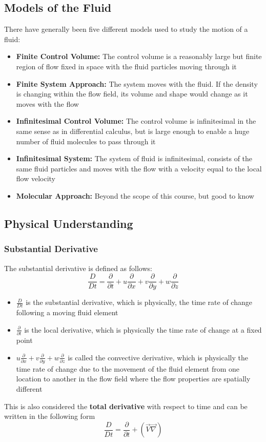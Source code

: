\documentclass[11pt]{article}
\begin{document}
\subsection{Models of the Fluid}
There have generally been five different models used to study the motion of a fluid:
\begin{itemize}
\item \textbf{Finite Control Volume:} The control volume is a reasonably large but finite region of flow fixed in space with the fluid particles moving through it
\item \textbf{Finite System Approach:} The system moves with the fluid. If the density is changing within the flow field, its volume and shape would change as it moves with the flow
\item \textbf{Infinitesimal Control Volume:} The control volume is infinitesimal in the same sense as in differential calculus, but is large enough to enable a huge number of fluid molecules to pass through it
\item \textbf{Infinitesimal System:} The system of fluid is infinitesimal, consists of the same fluid particles and moves with the flow with a velocity equal to the local flow velocity
\item \textbf{Molecular Approach:} Beyond the scope of this course, but good to know
\end{itemize}

\subsection{Physical Understanding}
\subsubsection{Substantial Derivative}
The substantial derivative is defined as follows:
$$ \frac{D}{Dt} = \frac{\partial}{\partial t} + u \frac{\partial}{\partial x} +v \frac{\partial}{\partial y} + w \frac{\partial}{\partial z}$$
\begin{itemize}
\item $\frac{D}{Dt}$ is the substantial derivative, which is physically, the time rate of change following a moving fluid element
\item $\frac{\partial}{\partial t}$ is the local derivative, which is physically the time rate of change at a fixed point
\item $ u \frac{\partial}{\partial x} +v \frac{\partial}{\partial y} + w \frac{\partial}{\partial z}$ is called the convective derivative, which is physically the time rate of change due to the movement of the fluid element from one location to another in the flow field where the flow properties are spatially different
\end{itemize}
This is also considered the \textbf{total derivative} with respect to time and can be written in the following form
$$ \frac{D}{Dt} = \frac{\partial}{\partial t} + (\vec{V}\vec{\nabla})$$
\end{document}
